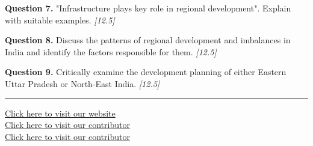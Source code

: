 \documentclass[11pt,a4paper]{article}
\newcommand{\pts}[1]{\hfill   \textit{[#1]}}
\begin{document}
\medskip


\noindent   \textbf{Question 7.} "Infrastructure plays key role in regional development". Explain with suitable examples. \pts{12.5}

\medskip


\noindent   \textbf{Question 8.} Discuss the patterns of regional development and imbalances in India and identify the factors responsible for them. \pts{12.5}

\medskip


\noindent   \textbf{Question 9.} Critically examine the development planning of either Eastern Uttar Pradesh or North-East India. \pts{12.5}

\vfill\rule{\linewidth}{0.4pt}

\begin{center}\small
\href{https://bhu-exam.vercel.app/}{Click here to visit our website}\\[4pt]
\href{https://me-aryan.vercel.app/}{Click here to visit our contributor}\\[4pt]
\href{https://quashan-me.vercel.app/}{Click here to visit our contributor}
\end{center}
\end{document}
